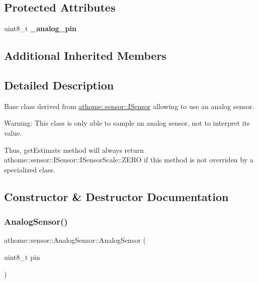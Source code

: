 \subsection*{Protected Attributes}
\begin{DoxyCompactItemize}
\item 
\mbox{\label{classathome_1_1sensor_1_1_analog_sensor_a06c196fae2f37af456406430651653a9}} 
uint8\+\_\+t {\bfseries \+\_\+analog\+\_\+pin}
\end{DoxyCompactItemize}
\subsection*{Additional Inherited Members}


\subsection{Detailed Description}
Base class derived from \mbox{\hyperlink{classathome_1_1sensor_1_1_i_sensor}{athome\+::sensor\+::\+I\+Sensor}} allowing to use an analog sensor.

Warning\+: This class is only able to sample an analog sensor, not to interpret its value.

Thus, {\ttfamily get\+Estimate} method will always return athome\+::sensor\+::\+I\+Sensor\+::\+I\+Sensor\+Scale\+::\+Z\+E\+RO if this method is not overriden by a specialized class. 

\subsection{Constructor \& Destructor Documentation}
\mbox{\label{classathome_1_1sensor_1_1_analog_sensor_acd973b3cf9be02ca318eea594e8732d3}} 
\subsubsection{\texorpdfstring{Analog\+Sensor()}{AnalogSensor()}}
{\footnotesize\ttfamily athome\+::sensor\+::\+Analog\+Sensor\+::\+Analog\+Sensor (\begin{DoxyParamCaption}\item[{uint8\+\_\+t}]{pin }\end{DoxyParamCaption})}


